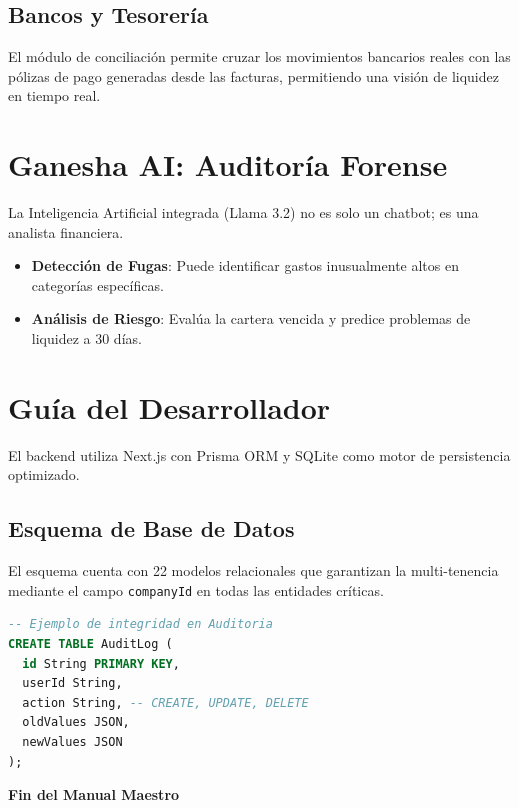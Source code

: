\documentclass[12pt, a4paper, oneside]{book}
\begin{document}
\section{Bancos y Tesorería}
El módulo de conciliación permite cruzar los movimientos bancarios reales con las pólizas de pago generadas desde las facturas, permitiendo una visión de liquidez en tiempo real.

\chapter{Ganesha AI: Auditoría Forense}
La Inteligencia Artificial integrada (Llama 3.2) no es solo un chatbot; es una analista financiera.
\begin{itemize}
    \item \textbf{Detección de Fugas}: Puede identificar gastos inusualmente altos en categorías específicas.
    \item \textbf{Análisis de Riesgo}: Evalúa la cartera vencida y predice problemas de liquidez a 30 días.
\end{itemize}

\chapter{Guía del Desarrollador}
El backend utiliza Next.js con Prisma ORM y SQLite como motor de persistencia optimizado.

\section{Esquema de Base de Datos}
El esquema cuenta con 22 modelos relacionales que garantizan la multi-tenencia mediante el campo \texttt{companyId} en todas las entidades críticas.

\begin{lstlisting}[language=SQL]
-- Ejemplo de integridad en Auditoria
CREATE TABLE AuditLog (
  id String PRIMARY KEY,
  userId String,
  action String, -- CREATE, UPDATE, DELETE
  oldValues JSON,
  newValues JSON
);
\end{lstlisting}

\vfill
\centering
\textbf{Fin del Manual Maestro}
\end{document}
